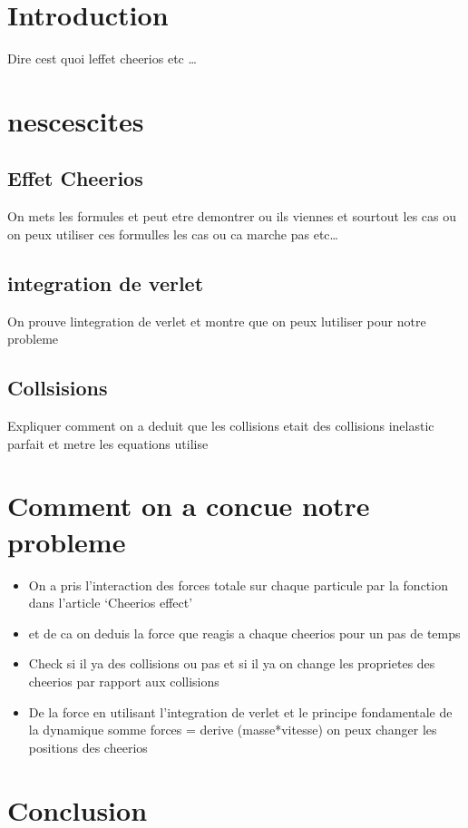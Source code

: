 \documentclass[a4paper, 11pt, oneside]{article} %
\begin{document}
 

\newpage
\section*{Introduction}
    Dire cest quoi leffet cheerios etc \ldots

\section{nescescites}
    \subsection{Effet Cheerios}
    On mets les formules et peut etre demontrer ou ils viennes et sourtout les cas ou on peux utiliser ces formulles les cas ou ca marche pas etc\ldots
    \subsection{integration de verlet}
    On prouve lintegration de verlet et montre que on peux lutiliser pour notre probleme
    \subsection{Collsisions}
    Expliquer comment on a deduit que les collisions etait des collisions inelastic parfait et metre les equations utilise

\section{Comment on a concue notre probleme}
    \begin{itemize}
        \item On a pris l'interaction des forces totale sur chaque particule par la fonction dans l'article `Cheerios effect'
        \item et de ca on deduis la force que reagis a chaque cheerios pour un pas de temps 
        \item Check si il ya des collisions ou pas et si il ya on change les proprietes des cheerios par rapport aux collisions
        \item De la force en utilisant l'integration de verlet et le principe fondamentale de la dynamique somme forces = derive (masse*vitesse) on peux changer les positions des cheerios
    \end{itemize}
\section*{Conclusion}
\end{document}
